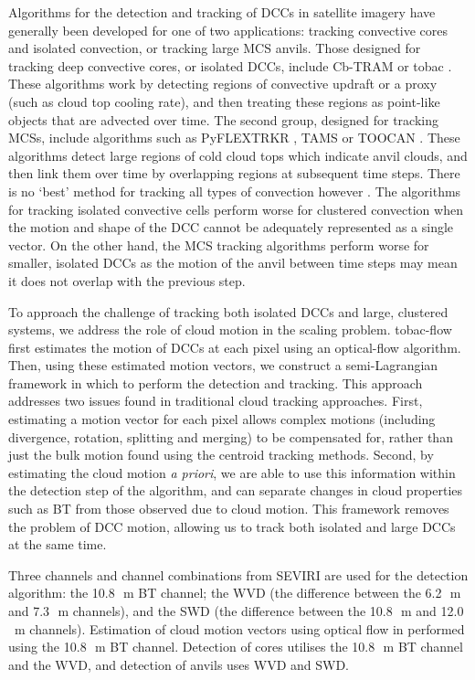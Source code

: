 \documentclass[acp, manuscript]{copernicus}
\begin{document}
Algorithms for the detection and tracking of DCCs in satellite imagery have generally been developed for one of two applications: tracking convective cores and isolated convection, or tracking large MCS anvils.
Those designed for tracking deep convective cores, or isolated DCCs, include Cb-TRAM \citep{zinner_cbtram_2008,zinner_validation_2013} or tobac \citep{heikenfeld_tobac_2019}.
These algorithms work by detecting regions of convective updraft or a proxy (such as cloud top cooling rate), and then treating these regions as point-like objects that are advected over time. 
The second group, designed for tracking MCSs, include algorithms such as PyFLEXTRKR \citep{feng_pyflextrkr_2022}, TAMS \citep{nunezocasio_tracking_2020} or TOOCAN \citep{fiolleau_algorithm_2013}. 
These algorithms detect large regions of cold cloud tops which indicate anvil clouds, and then link them over time by overlapping regions at subsequent time steps. 
There is no `best' method for tracking all types of convection however \citep{lakshmanan_objective_2010}. 
The algorithms for tracking isolated convective cells perform worse for clustered convection when the motion and shape of the DCC cannot be adequately represented as a single vector. 
On the other hand, the MCS tracking algorithms perform worse for smaller, isolated DCCs as the motion of the anvil between time steps may mean it does not overlap with the previous step.

To approach the challenge of tracking both isolated DCCs and large, clustered systems, we address the role of cloud motion in the scaling problem. 
tobac-flow first estimates the motion of DCCs at each pixel using an optical-flow algorithm. 
Then, using these estimated motion vectors, we construct a semi-Lagrangian framework in which to perform the detection and tracking. 
This approach addresses two issues found in traditional cloud tracking approaches.
First, estimating a motion vector for each pixel allows complex motions (including divergence, rotation, splitting and merging) to be compensated for, rather than just the bulk motion found using the centroid tracking methods.
Second, by estimating the cloud motion \textit{a priori}, we are able to use this information within the detection step of the algorithm, and can separate changes in cloud properties such as BT from those observed due to cloud motion.
This framework removes the problem of DCC motion, allowing us to track both isolated and large DCCs at the same time.

Three channels and channel combinations from SEVIRI are used for the detection algorithm: the 10.8\,\unit{\mu m} BT channel; the WVD (the difference between the 6.2\,\unit{\mu m} and 7.3\,\unit{\mu m} channels), and the SWD (the difference between the 10.8\,\unit{\mu m} and 12.0\,\unit{\mu m} channels).
Estimation of cloud motion vectors using optical flow in performed using the 10.8\,\unit{\mu m} BT channel.
Detection of cores utilises the 10.8\,\unit{\mu m} BT channel and the WVD, and detection of anvils uses WVD and SWD.
\end{document}
